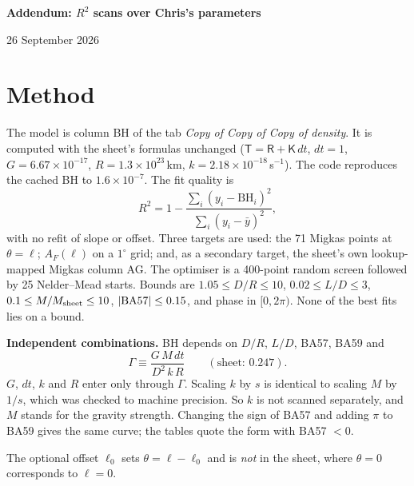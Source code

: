\documentclass[10pt]{article}
\begin{document}
{\centering\large\textbf{Addendum: $R^2$ scans over Chris's parameters}\par\normalsize 26 September 2026\par}

\section{Method}
The model is column BH of the tab \emph{Copy of Copy of Copy of density}. It is computed with the sheet's formulas unchanged ($\mathsf T=\mathsf R+\mathsf K\,dt$, $dt=1$, $G=6.67\times10^{-17}$, $R=1.3\times10^{23}$\,km, $k=2.18\times10^{-18}$\,s$^{-1}$). The code reproduces the cached BH to $1.6\times10^{-7}$. The fit quality is
\begin{equation}
R^2=1-\frac{\sum_i(y_i-\mathrm{BH}_i)^2}{\sum_i(y_i-\bar y)^2},
\end{equation}
with no refit of slope or offset. Three targets are used: the 71 Migkas points at $\theta=\ell$; $A_F(\ell)$ on a $1^\circ$ grid; and, as a secondary target, the sheet's own lookup-mapped Migkas column AG. The optimiser is a 400-point random screen followed by 25 Nelder--Mead starts. Bounds are $1.05\le D/R\le10$, $0.02\le L/D\le3$, $0.1\le M/M_{\rm sheet}\le10$, $|{\rm BA57}|\le0.15$, and phase in $[0,2\pi)$. None of the best fits lies on a bound.

\textbf{Independent combinations.} BH depends on $D/R$, $L/D$, BA57, BA59 and
\begin{equation}
\Gamma\equiv\frac{G\,M\,dt}{D^2\,k\,R}\qquad(\text{sheet: }0.247).
\end{equation}
$G$, $dt$, $k$ and $R$ enter only through $\Gamma$. Scaling $k$ by $s$ is identical to scaling $M$ by $1/s$, which was checked to machine precision. So $k$ is not scanned separately, and $M$ stands for the gravity strength. Changing the sign of BA57 and adding $\pi$ to BA59 gives the same curve; the tables quote the form with BA57 $<0$.

The optional offset $\ell_0$ sets $\theta=\ell-\ell_0$ and is \emph{not} in the sheet, where $\theta=0$ corresponds to $\ell=0$.
\end{document}
